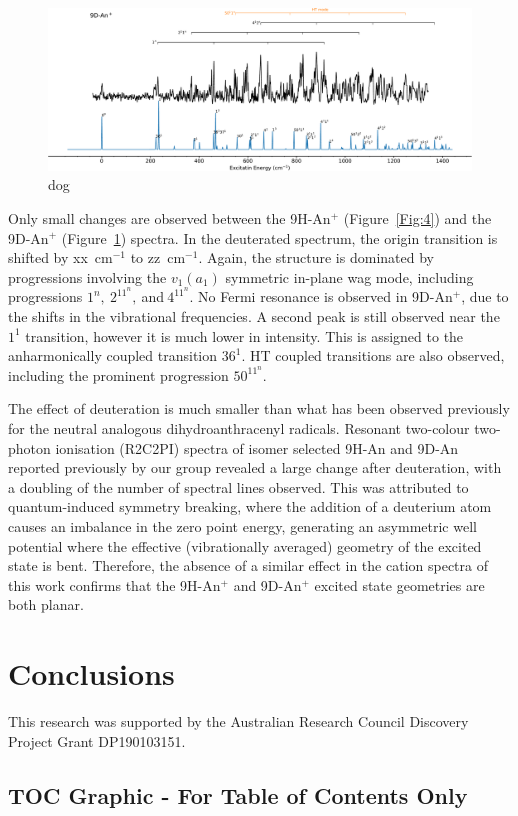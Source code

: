 \documentclass[journal=jpcafh,manuscript=article,layout=onecolumn, 12pt]{achemso}
\begin{document}
\begin{figure} [h]
	\includegraphics[width=1\textwidth]{figures/9D-An+w}
	\caption{dog}
	\label{Fig:6}
\end{figure}

Only small changes are observed between the 9H-An$^+$ (Figure~\ref{Fig:4}) and the 9D-An$^+$ (Figure~\ref{Fig:6}) spectra. In the deuterated spectrum, the origin transition is shifted by xx~cm$^{-1}$ to zz~cm$^{-1}$. Again, the structure is dominated by progressions involving the $v_1 (a_1)$ symmetric in-plane wag mode, including progressions $1^n,~2^11^n,~$and$~4^11^n$. No Fermi resonance is observed in 9D-An$^+$, due to the shifts in the vibrational frequencies. A second peak is still observed near the $1^1$ transition, however it is much lower in intensity. This is assigned to the anharmonically coupled transition $36^1$. HT coupled transitions are also observed, including the prominent progression $50^11^n$.

The effect of deuteration is much smaller than what has been observed previously for the neutral analogous dihydroanthracenyl radicals. Resonant two-colour two-photon ionisation (R2C2PI) spectra of isomer selected 9H-An and 9D-An reported previously by our group revealed a large change after deuteration, with a doubling of the number of spectral lines observed. This was attributed to quantum-induced symmetry breaking, where the addition of a deuterium atom causes an imbalance in the zero point energy, generating an asymmetric well potential where the effective (vibrationally averaged) geometry of the excited state is bent. Therefore, the absence of a similar effect in the cation spectra of this work confirms that the 9H-An$^+$ and 9D-An$^+$ excited state geometries are both planar.

\section{Conclusions}

\begin{acknowledgement}
	This research was supported by the Australian Research Council Discovery
	Project Grant DP190103151.  
\end{acknowledgement}



\newpage
\onecolumn
\subsection{TOC Graphic - For Table of Contents Only}
\vspace{2ex}
\begin{center}
\end{center}
\end{document}

